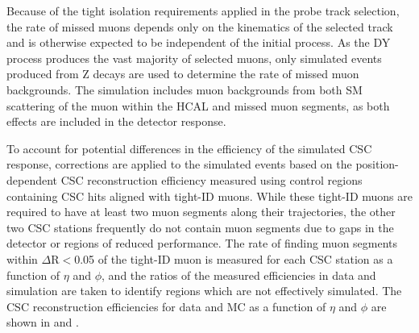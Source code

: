 Because of the tight isolation requirements applied in the probe track selection, the rate of missed muons depends only on the kinematics of the selected track and is otherwise expected to be independent of the initial process. 
As the DY process produces the vast majority of selected muons, only simulated events produced from Z decays are used to determine the rate of missed muon backgrounds.
The simulation includes muon backgrounds from both SM scattering of the muon within the HCAL and missed muon segments, as both effects are included in the detector response.

To account for potential differences in the efficiency of the simulated CSC response, corrections are applied to the simulated events based on the position-dependent CSC reconstruction efficiency measured using control regions containing CSC hits aligned with tight-ID muons.
While these tight-ID muons are required to have at least two muon segments along their trajectories, the other two CSC stations frequently do not contain muon segments due to gaps in the detector or regions of reduced performance.
The rate of finding muon segments within $\Delta$R$<$0.05 of the tight-ID muon is measured for each CSC station as a function of $\eta$ and $\phi$, and the ratios of the measured efficiencies in data and simulation are taken to identify regions which are not effectively simulated.
The CSC reconstruction efficiencies for data and MC as a function of $\eta$ and $\phi$ are shown in  and .

